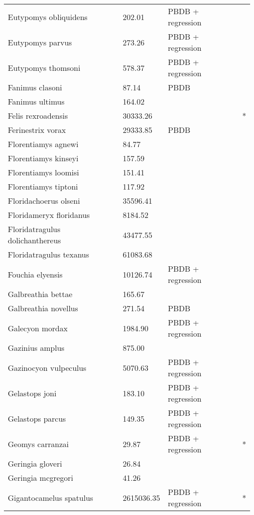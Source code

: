 \documentclass{article}
\begin{document}
\begin{center}
\begin{longtable}{p{} p{} p{} p{}}
    Eutypomys obliquidens & 202.01 & PBDB + regression &  \\ 
    Eutypomys parvus & 273.26 & PBDB + regression &  \\ 
    Eutypomys thomsoni & 578.37 & PBDB + regression &  \\ 
    Fanimus clasoni & 87.14 & PBDB &  \\ 
    Fanimus ultimus & 164.02 & \cite{Tomiya2013} &  \\ 
    Felis rexroadensis & 30333.26 & \cite{Tomiya2013} & * \\ 
    Ferinestrix vorax & 29333.85 & PBDB &  \\ 
    Florentiamys agnewi & 84.77 & \cite{Tomiya2013} &  \\ 
    Florentiamys kinseyi & 157.59 & \cite{Tomiya2013} &  \\ 
    Florentiamys loomisi & 151.41 & \cite{Tomiya2013} &  \\ 
    Florentiamys tiptoni & 117.92 & \cite{Tomiya2013} &  \\ 
    Floridachoerus olseni & 35596.41 & \cite{Tomiya2013} &  \\ 
    Floridameryx floridanus & 8184.52 & \cite{Tomiya2013} &  \\ 
    Floridatragulus dolichanthereus & 43477.55 & \cite{Tomiya2013} &  \\ 
    Floridatragulus texanus & 61083.68 & \cite{Tomiya2013} &  \\ 
    Fouchia elyensis & 10126.74 & PBDB + regression &  \\ 
    Galbreathia bettae & 165.67 & \cite{Tomiya2013} &  \\ 
    Galbreathia novellus & 271.54 & PBDB &  \\ 
    Galecyon mordax & 1984.90 & PBDB + regression &  \\ 
    Gazinius amplus & 875.00 & \cite{Soligo2006} &  \\ 
    Gazinocyon vulpeculus & 5070.63 & PBDB + regression &  \\ 
    Gelastops joni & 183.10 & PBDB + regression &  \\ 
    Gelastops parcus & 149.35 & PBDB + regression &  \\ 
    Geomys carranzai & 29.87 & PBDB + regression & * \\ 
    Geringia gloveri & 26.84 & \cite{Tomiya2013} &  \\ 
    Geringia mcgregori & 41.26 & \cite{Tomiya2013} &  \\ 
    Gigantocamelus spatulus & 2615036.35 & PBDB + regression & * \\ 

\end{longtable}
\end{center}
\end{document}

